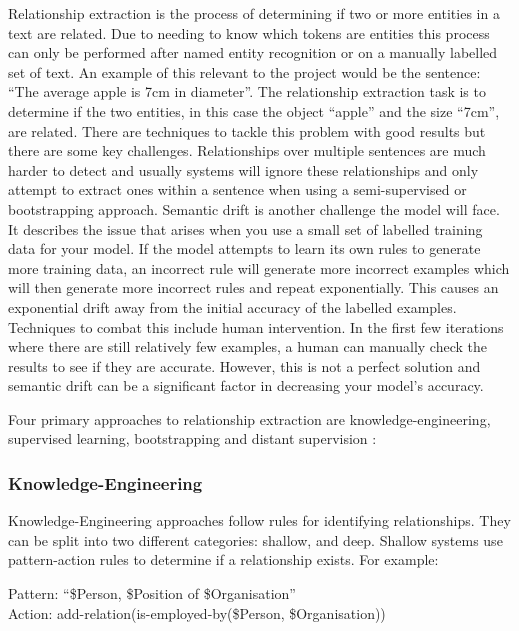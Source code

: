 \documentclass[11pt,oneside]{book}
\begin{document}
Relationship extraction is the process of determining if two or more entities in a text are related. Due to needing to know which tokens are entities this process can only be performed after named entity recognition or on a manually labelled set of text. An example of this relevant to the project would be the sentence: “The average apple is 7cm in diameter”. The relationship extraction task is to determine if the two entities, in this case the object “apple” and the size “7cm”, are related. There are techniques to tackle this problem with good results but there are some key challenges. Relationships over multiple sentences are much harder to detect and usually systems will ignore these relationships and only attempt to extract ones within a sentence when using a semi-supervised or bootstrapping approach. Semantic drift is another challenge the model will face. It describes the issue that arises when you use a small set of labelled training data for your model. If the model attempts to learn its own rules to generate more training data, an incorrect rule will generate more incorrect examples which will then generate more incorrect rules and repeat exponentially. This causes an exponential drift away from the initial accuracy of the labelled examples. Techniques to combat this include human intervention. In the first few iterations where there are still relatively few examples, a human can manually check the results to see if they are accurate. However, this is not a perfect solution and semantic drift can be a significant factor in decreasing your model’s accuracy.

Four primary approaches to relationship extraction are knowledge-engineering, supervised learning, bootstrapping and distant supervision \citep{text_processing_lecture_6}:

\subsubsection{Knowledge-Engineering}

Knowledge-Engineering approaches follow rules for identifying relationships. They can be split into two different categories: shallow, and deep. Shallow systems use pattern-action rules to determine if a relationship exists. For example:

\begin{displayquote}
Pattern: “\$Person, \$Position of \$Organisation”
\\Action: add-relation(is-employed-by(\$Person, \$Organisation))
\end{displayquote}
\end{document}
